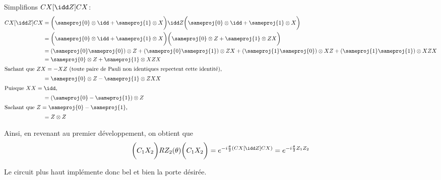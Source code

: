 \documentclass{article}
\begin{document}
Simplifions $CX[\idd Z]CX$:
\begin{align*}
    CX[\idd Z]CX&=\bigg(\sameproj{0}\otimes \idd +\sameproj{1}\otimes X\bigg)\idd Z\bigg(\sameproj{0}\otimes \idd +\sameproj{1}\otimes X\bigg)\\
    &=\bigg(\sameproj{0}\otimes \idd +\sameproj{1}\otimes X\bigg)\bigg(\sameproj{0}\otimes Z +\sameproj{1}\otimes ZX\bigg)\\
    &=(\sameproj{0}\sameproj{0})\otimes Z+(\sameproj{0}\sameproj{1})\otimes ZX
    +(\sameproj{1}\sameproj{0})\otimes XZ
    +(\sameproj{1}\sameproj{1})\otimes XZX\\
    &=\sameproj{0}\otimes Z+\sameproj{1}\otimes XZX\\
    \intertext{Sachant que $ZX=-XZ$ (toute paire de Pauli non identiques repectent cette identité),}
    &=\sameproj{0}\otimes Z-\sameproj{1}\otimes ZXX\\
    \intertext{Puisque $XX=\idd$,}
    &=(\sameproj{0}-\sameproj{1})\otimes Z\\
    \intertext{Sachant que $Z=\sameproj{0}-\sameproj{1}$,}
    &=Z\otimes Z
\end{align*}

Ainsi, en revenant au premier développement, on obtient que
\begin{equation*}
    \bigg(C_1X_2\bigg)RZ_2(\theta)\bigg(C_1X_2\bigg)=e^{-i\frac{\theta}{2}(CX[\idd Z]CX)}=e^{-i\frac{\theta}{2}Z_1Z_2}
\end{equation*}

Le circuit plus haut implémente donc bel et bien la porte désirée.
\end{document}
